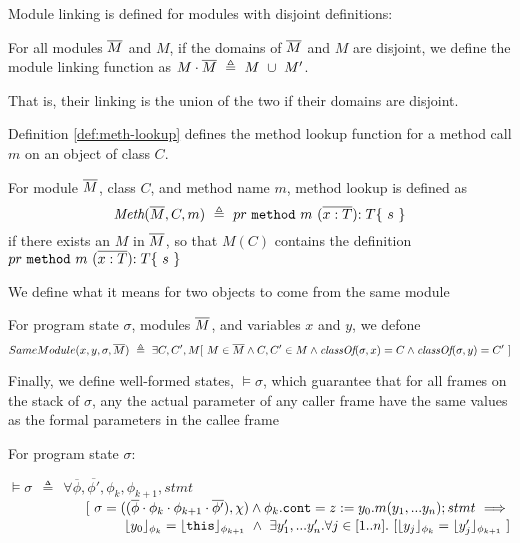 Module linking is defined for modules with disjoint definitions:

\begin{definition}
\label{def:linking}
For all modules $\overline{M}$ and $M$, if the domains of $\overline{M}$ and $M$ are disjoint, 
we define the module linking function as $M\cdot \overline{M}\ \triangleq\ M\ \cup\ M'$.
\end{definition}
That is,  their linking is the union of the two if their domains are disjoint.

Definition \ref{def:meth-lookup} defines the method lookup function for a method
call $m$ on an object of class $C$.
\begin{definition}
\label{def:meth-lookup}
For module $\overline{M}$, class $C$, and method name $m$, method lookup is defined as 
$$\textit{Meth}(\overline{M}, C, m)\ \triangleq\ { pr}\  \mbox{\normalfont{\texttt{method}}}\ m\ (\overline{x : T}) {:T}\{\ s\ \}  $$
if there exists an $M$ in $\overline{M}$, so that $M(C)$ contains the definition ${ pr}\  \prg{method}\ m\ (\overline{x : T}) {:T}\{\ s\ \} $
\end{definition}



\newcommand{\Same}[4]{{SameModule(#1,#2,#3,#4)}}

We define what it means for two objects to come from the same module
\begin{definition}
\label{def:class-lookup}
For program state $\sigma$,  modules $\overline{M}$, and variables $x$ and $y$, we defone
$$\Same {x} {y} {\sigma}{\Mtwo}\ \triangleq\ \exists C, C', M[ \ M\in \Mtwo \wedge C, C'\in M \wedge  \class{\sigma}{x}=C \wedge \class{\sigma}{y} =C'\ ]$$
\end{definition}

Finally, we define well-formed states, $\models \sigma$, which guarantee  that for all frames  on the stack of $\sigma$, any the actual parameter of any caller frame have the same values as the formal parameters in the callee frame
\begin{definition}
\label{def:wf:state}
For program state $\sigma$:

$\models \sigma \ \ \triangleq \ \  \forall \overline {\phi}, \overline {\phi'}, {\phi_k}, {\phi_{k+1}}, stmt $\\
$\strut \hspace{2cm}  [\ \sigma = ((\overline {\phi}\cdot{\phi_k}\cdot{\phi_{k+1}}\cdot{\overline {\phi'}}), \chi) \wedge \phi_k.\prg{cont}=z:=y_0.m(y_1,...y_n); stmt \ \Longrightarrow \ 
$
\\
$\strut \hspace{3cm} \interpret {\phi_k} {y_0} = \interpret {\phi_{k+1}} {\prg{this}} \ \wedge \  \exists y_1',...y_n'.\forall j\in [1..n].\ [ \interpret {\phi_k} {y_j} = \interpret {\phi_{k+1}} {y_j'} \ ]$
\end{definition}

